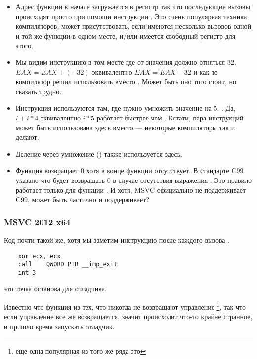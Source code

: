 \begin{itemize}
\item Адрес функции \printf в начале загружается в регистр 
\ESI так что последующие вызовы
\printf происходят просто при помощи инструкции .
Это очень популярная техника компиляторов, может присутствовать, если имеются несколько вызовов
одной и той же функции в одном месте, и/или имеется свободный регистр для этого.

\item Мы видим инструкцию  в том месте где от значения должно отняться 32.
$EAX=EAX+(-32)$ эквивалентно $EAX=EAX-32$ и как-то компилятор решил использовать  вместо .
Может быть оно того стоит, но сказать трудно.

\item Инструкция \LEA используются там, где нужно умножить значение на 5: .
Да, $i+i*4$ эквивалентно $i*5$ \AndENRU \LEA работает быстрее чем .
Кстати, пара инструкций  может быть использована здесь
вместо \LEA --- некоторые компиляторы так и делают.

\item Деление через умножение () также используется здесь.

\item Функция \main возвращает 0 хотя  
в конце функции отсутствует.
В стандарте C99  указано что \main 
будет возвращать 0 в случае отсутствия выражения 
.
Это правило работает только для функции \main.
И хотя, MSVC официально не поддерживает C99, может быть частично и поддерживает?

\end{itemize}

\subsubsection{\Optimizing MSVC 2012 x64}

Код почти такой же, хотя мы заметим инструкцию  после каждого вызова .

\begin{lstlisting}
	xor	ecx, ecx
	call	QWORD PTR __imp_exit
	int	3
\end{lstlisting}

 это точка останова для отладчика.

Известно что функция  из тех, что никогда не возвращают управление
\footnote{еще одна популярная из того же ряда это },
так что если управление все же возвращается, значит происходит что-то крайне странное, и пришло
время запускать отладчик.

